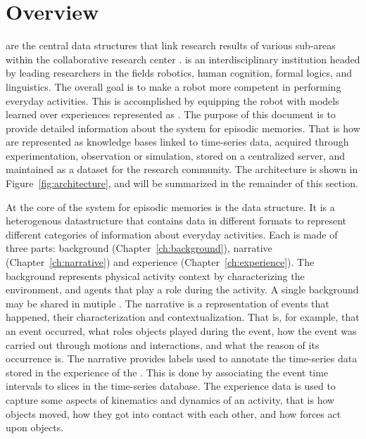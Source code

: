 \section{Overview}
\label{sec:overview}

\neems are the central data structures that link research results of various sub-areas within the collaborative research center \ease.
\ease is an interdisciplinary institution headed by leading researchers in the fields robotics, human cognition, formal logics, and linguistics.
The overall goal is to make a robot more competent in performing everyday activities.
This is accomplished by equipping the robot with models learned over experiences represented as \neems.
The purpose of this document is to provide detailed information about the \ease system for episodic memories.
That is how \neems are
represented as knowledge bases linked to time-series data,
acquired through experimentation, observation or simulation,
stored on a centralized server, and
maintained as a dataset for the research community.
The architecture is shown in Figure~\ref{fig:architecture}, and will be summarized in the remainder of this section.

At the core of the \ease system for episodic memories is the \neem data structure.
It is a heterogenous datastructure that contains data in different formats to represent different categories of information about everyday activities.
Each \neem is made of three parts: background (Chapter~\ref{ch:background}), narrative (Chapter~\ref{ch:narrative}) and experience (Chapter~\ref{ch:experience}).
The background represents physical activity context by characterizing the environment, and agents that play a role during the activity.
A single background may be shared in mutiple \neems.
The narrative is a representation of events that happened, their characterization and contextualization.
That is, for example, that an event occurred, what roles objects played during the event, how the event was carried out through motions and interactions, and what the reason of its occurrence is.
The narrative provides labels used to annotate the time-series data stored in the experience of the \neem.
This is done by associating the event time intervals to slices in the time-series database.
The experience data is used to capture some aspects of kinematics and dynamics of an activity, that is how objects moved, how they got into contact with each other, and how forces act upon objects.

